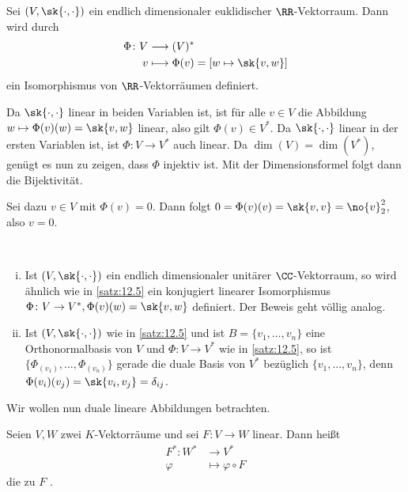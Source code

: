 \begin{satz}
	\label{satz:12.5}
	Sei $(V,\sk{\cdot,\cdot})$ ein endlich dimensionaler euklidischer $\RR$-Vektorraum.
	Dann wird durch
	\begin{align*}
		\Phi \colon V &\longrightarrow (V)^* \\
		v &\longmapsto \Phi(v) = [w \mapsto \sk{v,w}]
	\end{align*}
	ein Isomorphismus von $\RR$-Vektorräumen definiert.
\end{satz}

\begin{beweis}
	Da $\sk{\cdot,\cdot}$ linear in beiden Variablen ist, ist für alle $v \in V$ die Abbildung $w \mapsto \Phi(v)(w) = \sk{v,w}$ linear, also gilt $\Phi(v) \in V^*$.
	Da $\sk{\cdot,\cdot}$ linear in der ersten Variablen ist, ist $\Phi \colon V \rightarrow V^*$ auch linear.
	Da $\dim(V) = \dim(V^*)$, genügt es nun zu zeigen, dass $\Phi$ injektiv ist.
	Mit der Dimensionsformel folgt dann die Bijektivität.
	
	Sei dazu $v \in V$ mit $\Phi(v) = 0$.
	Dann folgt $0 = \Phi(v)(v) = \sk{v,v} = \no{v}_2^2$, also $v = 0$. 
	
\end{beweis}

\begin{bemerkung}
	\label{bem:12.6}
	\mbox{} \\[-1.4cm]
	\begin{enumerate}[(i)]
		\item Ist $(V,\sk{\cdot,\cdot})$ ein endlich dimensionaler unitärer $\CC$-Vektorraum, so wird ähnlich wie in \autoref{satz:12.5} ein konjugiert linearer Isomorphismus $\Phi \colon V \rightarrow V^*, \Phi(v)(w) = \sk{v,w}$ definiert.
		Der Beweis geht völlig analog.
		\item Ist $(V,\sk{\cdot,\cdot})$ wie in \autoref{satz:12.5} und ist $B = \{v_1,\dots,v_n\}$ eine Orthonormalbasis von $V$ und $\Phi \colon V \rightarrow V^*$ wie in \autoref{satz:12.5}, so ist $\{\Phi_(v_1),\dots,\Phi_(v_n)\}$ gerade die duale Basis von $V^*$ bezüglich $\{v_1,\dots,v_n\}$, denn $\Phi(v_i)(v_j) = \sk{v_i,v_j} = \delta_{ij}$.
	\end{enumerate}
\end{bemerkung}

Wir wollen nun duale lineare Abbildungen betrachten.

\begin{definition}
	\label{def:12.7}
	Seien $V,W$ zwei $K$-Vektorräume und sei $F \colon V \rightarrow W$ linear.
	Dann heißt
	\begin{align*}
		F^*\colon W^* &\longrightarrow V^* \\
		\varphi &\longmapsto \varphi \circ F
	\end{align*}
	die zu $F$ .
\end{definition}

